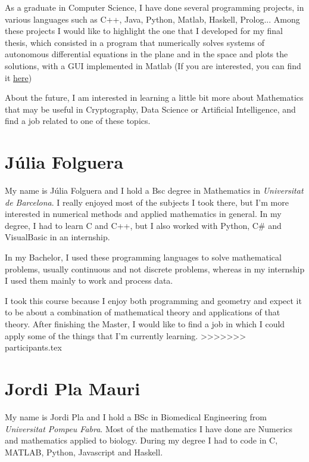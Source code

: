 \documentclass[11pt]{amsart}
\begin{document}
As a graduate in Computer Science, I have done several programming projects, in various languages such as C++, Java, Python, Matlab, Haskell, Prolog...
Among these projects I would like to highlight the one that I developed for my final thesis, which consisted in a program that numerically solves
systems of autonomous differential equations in the plane and in the space and plots the solutions, with a GUI implemented in Matlab 
(If you are interested, you can find it \href{https://github.com/ManuTorron5/TFG-app}{here})

About the future, I am interested in learning a little bit more about Mathematics that may be useful in Cryptography, Data Science or Artificial Intelligence,
and find a job related to one of these topics.


\section*{Júlia Folguera}

My name is Júlia Folguera and I hold a Bsc degree in Mathematics in \textit{Universitat de Barcelona}. I really enjoyed most of the subjects I took there,
but I'm more interested in numerical methods and applied mathematics in general. In my degree, I had to learn C and C++, but I also worked with Python, C\# and VisualBasic in an internship.

In my Bachelor, I used these programming languages to solve mathematical problems, usually continuous and not discrete problems, whereas in my internship
I used them mainly to work and process data.

I took this course because I enjoy both programming and geometry and expect it to be about a combination of mathematical theory and applications of that theory.
After finishing the Master, I would like to find a job in which I could apply some of the things that I'm currently learning.
>>>>>>> participants.tex


\medskip

\section*{Jordi Pla Mauri}

My name is Jordi Pla and I hold a BSc in Biomedical Engineering from
\textit{Universitat Pompeu Fabra}.
Most of the mathematics I have done are Numerics and
mathematics applied to biology.
During my degree I had to code in C, MATLAB, Python, Javascript and Haskell.
\end{document}
